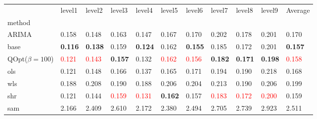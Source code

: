 \begin{tabular}{lllllllllll}
\toprule
 & level1 & level2 & level3 & level4 & level5 & level6 & level7 & level8 & level9 & Average \\
method &  &  &  &  &  &  &  &  &  &  \\
\midrule
ARIMA & 0.158 & 0.148 & 0.163 & 0.147 & 0.167 & 0.170 & 0.202 & 0.178 & 0.201 & 0.170 \\
base & \textbf{0.116} & \textbf{0.138} & 0.159 & \textbf{0.124} & 0.162 & \textbf{0.155} & 0.185 & 0.172 & 0.201 & \textbf{0.157} \\
\midrule
QOpt($\beta=100$) & \textcolor{red}{0.121} & \textcolor{red}{0.143} & \textbf{0.157} & 0.132 & \textcolor{red}{0.162} & \textcolor{red}{0.156} & \textbf{0.182} & \textbf{0.171} & \textbf{0.198} & \textcolor{red}{0.158} \\
ols & 0.121 & 0.148 & 0.166 & 0.137 & 0.165 & 0.171 & 0.194 & 0.190 & 0.218 & 0.168 \\
wls & 0.188 & 0.208 & 0.190 & 0.188 & 0.206 & 0.204 & 0.213 & 0.190 & 0.206 & 0.199 \\
shr & 0.121 & 0.144 & \textcolor{red}{0.159} & \textcolor{red}{0.131} & \textbf{0.162} & 0.157 & \textcolor{red}{0.183} & \textcolor{red}{0.172} & \textcolor{red}{0.200} & 0.159 \\
sam & 2.166 & 2.409 & 2.610 & 2.172 & 2.380 & 2.494 & 2.705 & 2.739 & 2.923 & 2.511 \\
\bottomrule
\end{tabular}